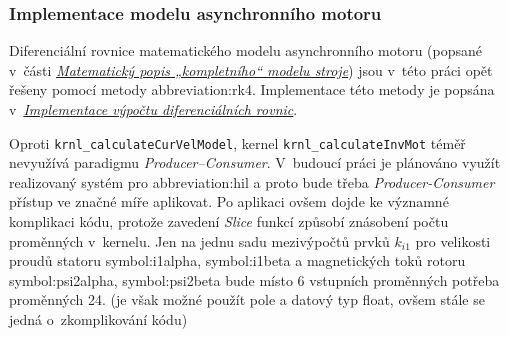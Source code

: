 \documentclass[a4paper, twoside, 11pt]{article}
\newcommand{\fbar}{\FloatBarrier}
\begin{document}
		\subsubsection{Implementace modelu asynchronního motoru}
			Diferenciální rovnice matematického modelu asynchronního motoru (popsané v~části \hyperref[subsec:matematicky-popis-kompletniho-modelu-stroje]{\textit{Matematický popis „kompletního“ modelu stroje}}) jsou v~této práci opět řešeny pomocí metody \gls{abbreviation:rk4}. Implementace této metody je popsána v~\hyperref[subsubsec:implementace-vypoctu-diferencialnich-rovnic]{\textit{Implementace výpočtu diferenciálních rovnic}}.\par
			Oproti \texttt{krnl\_calculateCurVelModel}, kernel \texttt{krnl\_calculateInvMot} téměř nevyužívá paradigmu \textit{Producer–Consumer}. V~budoucí práci je plánováno využít realizovaný systém pro \gls{abbreviation:hil} a proto bude třeba \textit{Producer-Consumer} přístup ve značné míře aplikovat. Po aplikaci ovšem dojde ke významné komplikaci kódu, protože zavedení \textit{Slice} funkcí způsobí znásobení počtu proměnných v~kernelu. Jen na jednu sadu mezivýpočtů prvků $k_{i1}$ pro velikosti proudů statoru \gls{symbol:i1alpha}, \gls{symbol:i1beta} a magnetických toků rotoru \gls{symbol:psi2alpha}, \gls{symbol:psi2beta} bude místo 6 vstupních proměnných potřeba proměnných 24. (je však možné použít pole a datový typ float, ovšem stále se jedná o~zkomplikování kódu)\par


	\fbar
\end{document}
